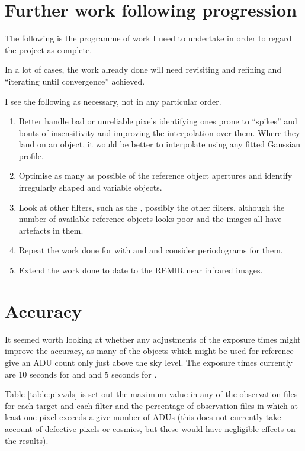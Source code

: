 \section{Further work following progression}
\protect\label{section:worktocome}

The following is the programme of work I need to undertake in order to regard
the project as complete.

In a lot of cases, the work already done will need revisiting and refining and
``iterating until convergence'' achieved.

I see the following as necessary, not in any particular order.

\begin{enumerate}
  \item Better handle bad or unreliable pixels identifying ones prone to
  ``spikes'' and bouts of insensitivity and improving the interpolation over
  them. Where they land on an object, it would be better to interpolate using
  any fitted Gaussian profile.
  \item Optimise as many as possible of the reference object apertures and
  identify irregularly shaped and variable objects.
  \item Look at other filters, such as the \gfilter, possibly the other filters,
  although the number of available reference objects looks poor and the
  {\zfilter} images all have artefacts in them.
  \item Repeat the work done for {\ross} with {\prox} and {\bstar} and consider
  periodograms for them.
  \item Extend the work done to date to the REMIR near infrared images.
\end{enumerate}

\section{Accuracy}
\protect\label{section:accuracy}

It seemed worth looking at whether any adjustments of the exposure times might
improve the accuracy, as many of the objects which might be used for reference
give an ADU count only just above the sky level. The exposure times currently
are 10 seconds for {\prox} and {\ross} and 5 seconds for \bstar.

Table \ref{table:pixvals} is set out the maximum value in any of the observation
files for each target and each filter and the percentage of observation files in
which at least one pixel exceeds a give number of ADUs (this does not currently
take account of defective pixels or cosmics, but these would have negligible
effects on the results).


